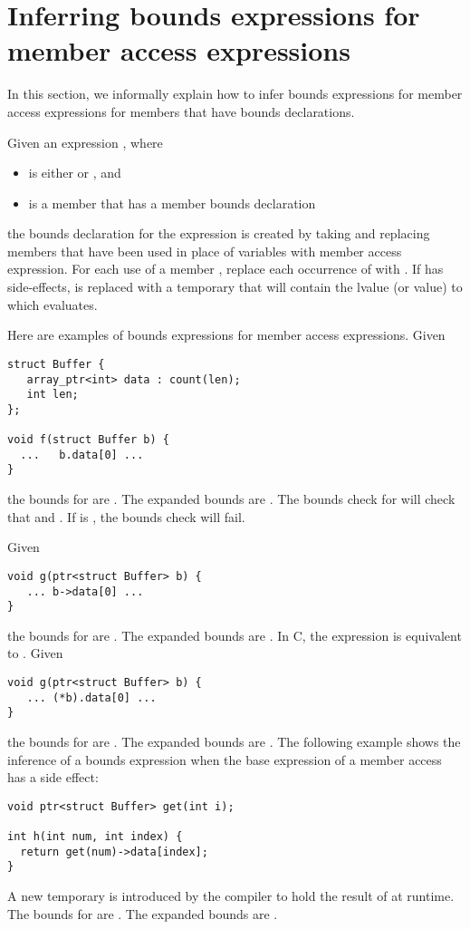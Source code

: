 \section{Inferring bounds expressions for member access expressions}

In this section, we informally explain how to infer bounds expressions for
member access expressions for members that have bounds declarations.

Given an expression   , where 
\begin{itemize}
\item {} is either  or \code{->}, and 
\item {} is a member that has a member bounds declaration  
\end{itemize}
the bounds declaration for the expression is created by taking  and replacing
members  that have been used in place of variables with member access
expression.  For each use of a member , replace each occurrence of 
with   .  If   has side-effects,
 is replaced with a temporary that will contain the lvalue (or value) to
which  evaluates.

Here are examples of bounds expressions for member access expressions.
Given
\begin{lstlisting}
struct Buffer {
   array_ptr<int> data : count(len);
   int len;
};

void f(struct Buffer b) {
  ...   b.data[0] ...
}
\end{lstlisting}
the bounds for  are .   The expanded bounds are
.   The bounds check for  will 
check that  and .
If  is , the bounds check will fail.

Given
\begin{lstlisting}
void g(ptr<struct Buffer> b) {
   ... b->data[0] ...
}
\end{lstlisting}
the bounds for  are .  The expanded bounds are
.
In C, the expression  is equivalent to .   Given
\begin{lstlisting}
void g(ptr<struct Buffer> b) {
   ... (*b).data[0] ...
}
\end{lstlisting}
the bounds for  are .  The expanded bounds are
.
The following example shows the inference of a bounds expression  when the base expression of
a member access has a side effect:
\begin{lstlisting}
void ptr<struct Buffer> get(int i);

int h(int num, int index) {
  return get(num)->data[index];
}
\end{lstlisting}
A new temporary  is introduced by the compiler to hold the result of
 at runtime.   
The bounds for  are .
The expanded bounds are 
  .


